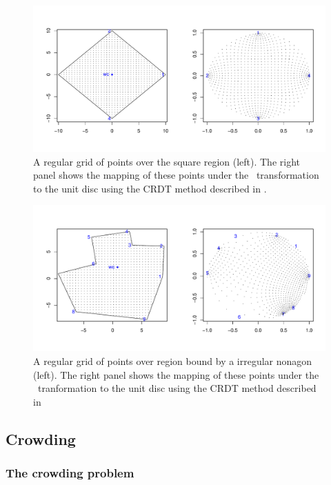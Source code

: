 \begin{figure}[t]
\centering
\includegraphics[scale=0.5]{sc/figs/squaredomain.pdf}
\caption{A regular grid of points over the square region (left). The right panel shows the mapping of these points under the \sch\ transformation to the unit disc using the CRDT method described in .}
\label{squaredomain}
\end{figure}

\begin{figure}[t]
\centering
\includegraphics[scale=0.5]{sc/figs/irregulardomain.pdf}
\caption{A regular grid of points over region bound by a irregular nonagon (left). The right panel shows the mapping of these points under the \sch\ tranformation to the unit disc using the CRDT method described in }
\label{irregdomain}
\end{figure}

\subsection{Crowding}
\label{sch-crowding}

\subsubsection{The crowding problem}

